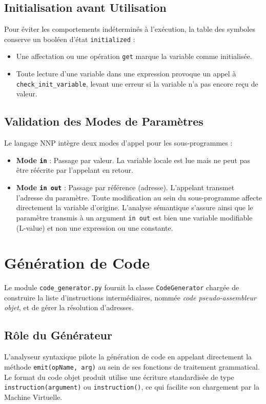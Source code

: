 \documentclass[a4paper, 12pt]{article}
\begin{document}
\subsection{Initialisation avant Utilisation}
Pour éviter les comportements indéterminés à l'exécution, la table des symboles conserve un booléen d'état \texttt{initialized} :
\begin{itemize}
    \item Une affectation ou une opération \texttt{get} marque la variable comme initialisée.
    \item Toute lecture d'une variable dans une expression provoque un appel à \texttt{check\_init\_}\allowbreak\texttt{variable}, levant une erreur si la variable n'a pas encore reçu de valeur.
\end{itemize}

\subsection{Validation des Modes de Paramètres}
Le langage NNP intègre deux modes d'appel pour les sous-programmes :
\begin{itemize}
    \item \textbf{Mode \texttt{in}} : Passage par valeur. La variable locale est lue mais ne peut pas être réécrite par l'appelant en retour.
    \item \textbf{Mode \texttt{in out}} : Passage par référence (adresse). L'appelant transmet l'adresse du paramètre. Toute modification au sein du sous-programme affecte directement la variable d'origine. L'analyse sémantique s'assure ainsi que le paramètre transmis à un argument \texttt{in out} est bien une variable modifiable (L-value) et non une expression ou une constante.
\end{itemize}

\newpage

\section{Génération de Code}

Le module \texttt{code\_generator.py} fournit la classe \texttt{CodeGenerator} chargée de construire la liste d'instructions intermédiaires, nommée \emph{code pseudo-assembleur objet}, et de gérer la résolution d'adresses.

\subsection{Rôle du Générateur}
L'analyseur syntaxique pilote la génération de code en appelant directement la méthode \texttt{emit(opName, arg)} au sein de ses fonctions de traitement grammatical.
Le format du code objet produit utilise une écriture standardisée de type \texttt{instruction(argument)} ou \texttt{instruction()}, ce qui facilite son chargement par la Machine Virtuelle.
\end{document}
